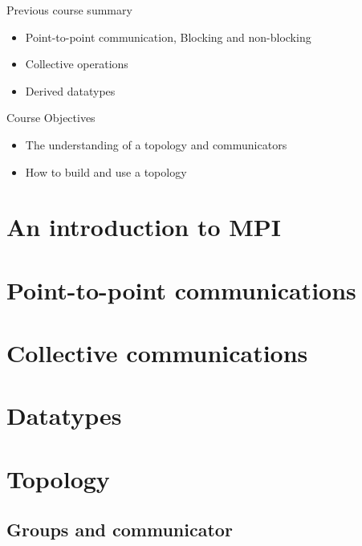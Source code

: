 \documentclass[aspectratio=43]{beamer}
\begin{document}
\cscstitle

\begin{frame}{Previous course summary}
\begin{itemize}
\item Point-to-point communication, Blocking and non-blocking
\item Collective operations
\item Derived datatypes
\end{itemize}
\end{frame}

\begin{frame}{Course Objectives}
\begin{itemize}
\item The understanding of a topology and communicators
\item How to build and use a topology
\end{itemize}
\end{frame}


\section{An introduction to MPI}
\section{Point-to-point communications}
\section{Collective communications}
\section{Datatypes}
\section{Topology}


\subsection{Groups and communicator}
\end{document}
